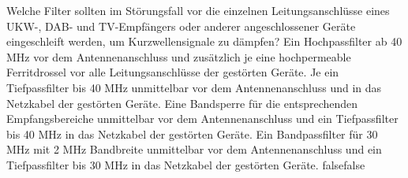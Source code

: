     {Welche Filter sollten im Störungsfall vor die einzelnen Leitungsanschlüsse eines UKW-, DAB- und TV-Empfängers oder anderer angeschlossener Geräte eingeschleift werden, um Kurzwellensignale zu dämpfen?}
    {Ein Hochpassfilter ab 40 MHz vor dem Antennenanschluss und zusätzlich je eine hochpermeable Ferritdrossel vor alle Leitungsanschlüsse der gestörten Geräte.}
    {Je ein Tiefpassfilter bis 40 MHz unmittelbar vor dem Antennenanschluss und in das Netzkabel der gestörten Geräte.}
    {Eine Bandsperre für die entsprechenden Empfangsbereiche unmittelbar vor dem Antennenanschluss und ein Tiefpassfilter bis 40 MHz in das Netzkabel der gestörten Geräte.}
    {Ein Bandpassfilter für 30 MHz mit 2 MHz Bandbreite unmittelbar vor dem Antennenanschluss und ein Tiefpassfilter bis 30 MHz in das Netzkabel der gestörten Geräte.}
    {false}{false}